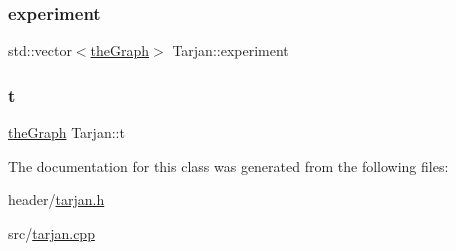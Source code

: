 \subsubsection{\texorpdfstring{experiment}{experiment}}
{\footnotesize\ttfamily std\+::vector$<$\hyperlink{class_graph_component_a982e0748a6e1b8dc74986f5f8b3dca5c_a982e0748a6e1b8dc74986f5f8b3dca5c}{the\+Graph}$>$ Tarjan\+::experiment}

\mbox{\label{class_tarjan_a54b0703f885a3514ea0bf4cdbc7fdaad_a54b0703f885a3514ea0bf4cdbc7fdaad}} 
\subsubsection{\texorpdfstring{t}{t}}
{\footnotesize\ttfamily \hyperlink{class_graph_component_a982e0748a6e1b8dc74986f5f8b3dca5c_a982e0748a6e1b8dc74986f5f8b3dca5c}{the\+Graph} Tarjan\+::t}



The documentation for this class was generated from the following files\+:\begin{DoxyCompactItemize}
\item 
header/\hyperlink{tarjan_8h}{tarjan.\+h}\item 
src/\hyperlink{tarjan_8cpp}{tarjan.\+cpp}\end{DoxyCompactItemize}
